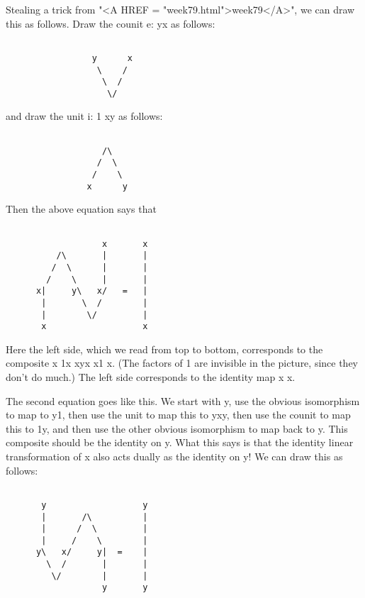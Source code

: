 Stealing a trick from "<A HREF = "week79.html">week79</A>", we can draw this as follows.  Draw the
counit e: yx  as follows:


\begin{verbatim}

                 y      x
                  \    /
                   \  / 
                    \/

\end{verbatim}
    
and draw the unit i: 1 \to  xy as follows:


\begin{verbatim}

                   /\
                  /  \
                 /    \
                x      y

\end{verbatim}
    
Then the above equation says that
                   

\begin{verbatim}

                   x       x
          /\       |       |
         /  \      |       |
        /    \     |       |
      x|     y\   x/   =   | 
       |       \  /        |
       |        \/         |
       x                   x

\end{verbatim}
    
Here the left side, which we read from top to bottom, corresponds to the
composite x \to  1x \to  xyx \to  x1 \to  x.  
(The factors of 1 are invisible in the
picture, since they don't do much.)  The left side corresponds to the
identity map x \to  x.  

The second equation goes like this.  We start with y, use the obvious
isomorphism to map to y1, then use the unit to map this to yxy, then use
the counit to map this to 1y, and then use the other obvious isomorphism
to map back to y.  This composite should be the identity on y.  What
this says is that the identity linear transformation of x also acts
dually as the identity on y!   We can draw this as follows:


\begin{verbatim}

       y                   y
       |       /\          |
       |      /  \         |
       |     /    \        |
      y\   x/     y|  =    | 
        \  /       |       |
         \/        |       |
                   y       y


\end{verbatim}
    
